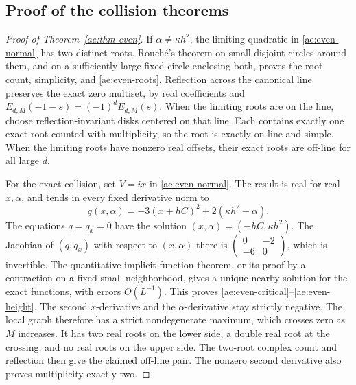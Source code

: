 \subsection{Proof of the collision theorems}
\begin{proof}[Proof of Theorem~\ref{ae:thm-even}]
If $\alpha\ne\kappa h^2$, the limiting quadratic in
\eqref{ae:even-normal} has two distinct roots. Rouch\'e's theorem on
small disjoint circles around them, and on a sufficiently large fixed
circle enclosing both, proves the root count, simplicity, and
\eqref{ae:even-roots}. Reflection across the canonical line preserves
the exact zero multiset, by real coefficients and
$E_{d,M}(-1-s)=(-1)^dE_{d,M}(s)$. When the limiting roots are on the
line, choose reflection-invariant disks centered on that line. Each
contains exactly one exact root counted with multiplicity, so the root
is exactly on-line and simple. When the limiting roots have nonzero
real offsets, their exact roots are off-line for all large $d$.

For the exact collision, set $V=ix$ in \eqref{ae:even-normal}. The
result is real for real $x,\alpha$, and tends in every fixed derivative
norm to
\[
 q(x,\alpha)=-3(x+hC)^2+2(\kappa h^2-\alpha).
\]
The equations $q=q_x=0$ have the solution
$(x,\alpha)=(-hC,\kappa h^2)$. The Jacobian of $(q,q_x)$ with
respect to $(x,\alpha)$ there is
$\left(\begin{smallmatrix}0&-2\\-6&0\end{smallmatrix}\right)$,
which is invertible. The quantitative implicit-function theorem,
or its proof by a contraction on a fixed small neighborhood, gives a
unique nearby solution for the exact functions, with errors $O(L^{-1})$.
This proves \eqref{ae:even-critical}--\eqref{ae:even-height}.
The second $x$-derivative and the $\alpha$-derivative stay strictly
negative. The local graph therefore has a strict nondegenerate maximum,
which crosses zero as $M$ increases. It has two real roots on the lower
side, a double real root at the crossing, and no real roots on the upper
side. The two-root complex count and reflection then give the claimed
off-line pair. The nonzero second derivative also proves multiplicity
exactly two.
\end{proof}

